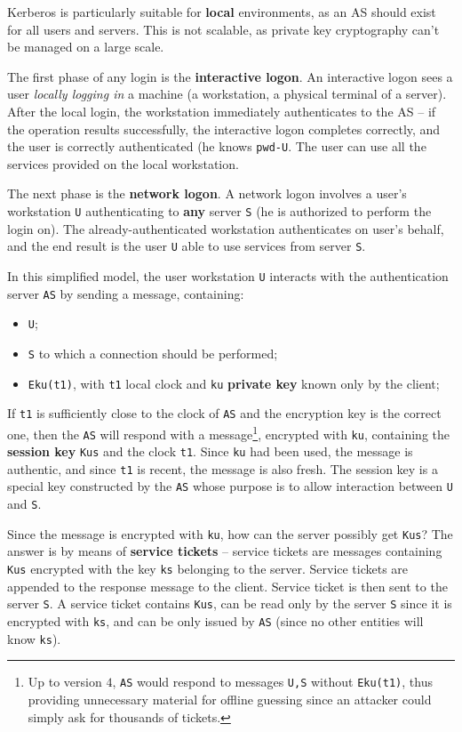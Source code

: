 \documentclass[10pt]{extbook}
\begin{document}
Kerberos is particularly suitable for \textbf{local} environments, as an AS
should exist for all users and servers. This is not scalable, as private key
cryptography can't be managed on a large scale.

The first phase of any login is the \textbf{interactive logon}. An interactive
logon sees a user \emph{locally logging in} a machine (a workstation, a
physical terminal of a server). After the local login, the workstation
immediately authenticates to the AS -- if the operation results successfully,
the interactive logon completes correctly, and the user is correctly
authenticated (he knows \texttt{pwd-U}. The user can use all the services
provided on the local workstation.

The next phase is the \textbf{network logon}. A network logon involves a user's
workstation \texttt{U} authenticating to \textbf{any} server \texttt{S} (he is
authorized to perform the login on). The already\--authenticated workstation
authenticates on user's behalf, and the end result is the user \texttt{U} able
to use services from server \texttt{S}.

In this simplified model, the user workstation \texttt{U} interacts with the authentication server \texttt{AS} by sending a message, containing:
\begin{itemize}
    \item \texttt{U};
    \item \texttt{S} to which a connection should be performed;
    \item \texttt{Eku(t1)}, with \texttt{t1} local clock and \texttt{ku}
        \textbf{private key} known only by the client;
\end{itemize}

If \texttt{t1} is sufficiently close to the clock of \texttt{AS} and the
encryption key is the correct one, then the \texttt{AS} will respond with a
message\footnote{Up to version $4$, \texttt{AS} would respond to messages
\texttt{U,S} without \texttt{Eku(t1)}, thus providing unnecessary material for
offline guessing since an attacker could simply ask for thousands of tickets.},
encrypted with \texttt{ku}, containing the \textbf{session key} \texttt{Kus}
and the clock \texttt{t1}. Since \texttt{ku} had been used, the message is
authentic, and since \texttt{t1} is recent, the message is also fresh. The
session key is a special key constructed by the \texttt{AS} whose purpose is to
allow interaction between \texttt{U} and \texttt{S}.

Since the message is encrypted with \texttt{ku}, how can the server possibly
get \texttt{Kus}? The answer is by means of \textbf{service tickets} -- service
tickets are messages containing \texttt{Kus} encrypted with the key \texttt{ks}
belonging to the server. Service tickets are appended to the response message
to the client. Service ticket is then sent to the server \texttt{S}. A service
ticket contains \texttt{Kus}, can be read only by the server \texttt{S} since
it is encrypted with \texttt{ks}, and can be only issued by \texttt{AS} (since
no other entities will know \texttt{ks}).
\end{document}
